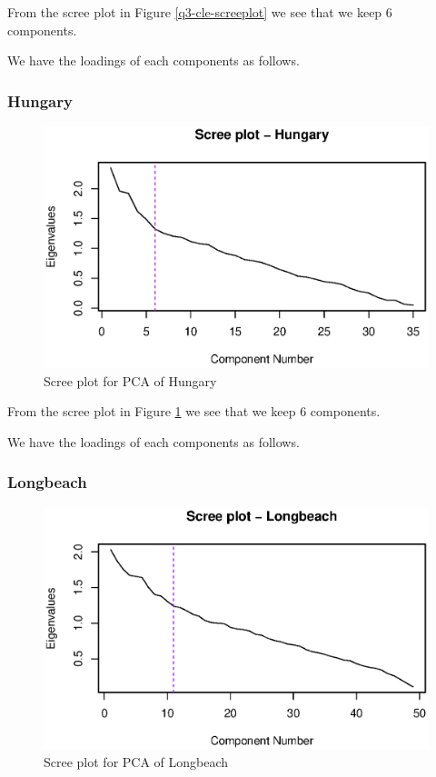 \documentclass[a4paper]{article}
\begin{document}
From the scree plot in Figure \ref{q3-cle-screeplot} we see that we keep 6 components.

We have the loadings of each components as follows. 



\subsubsection{Hungary}

\begin{figure}[H]
	\begin{center}
		\includegraphics[width=12cm]{question3output/hunscreeplot.eps} 
	\end{center}
	\caption{Scree plot for PCA of Hungary}
	\label{q3-hun-screeplot}
\end{figure}

From the scree plot in Figure \ref{q3-hun-screeplot} we see that we keep 6 components.

We have the loadings of each components as follows. 



\subsubsection{Longbeach}

\begin{figure}[H]
	\begin{center}
		\includegraphics[width=12cm]{question3output/lonscreeplot.eps} 
	\end{center}
	\caption{Scree plot for PCA of Longbeach}
	\label{q3-lon-screeplot}
\end{figure}
\end{document}

